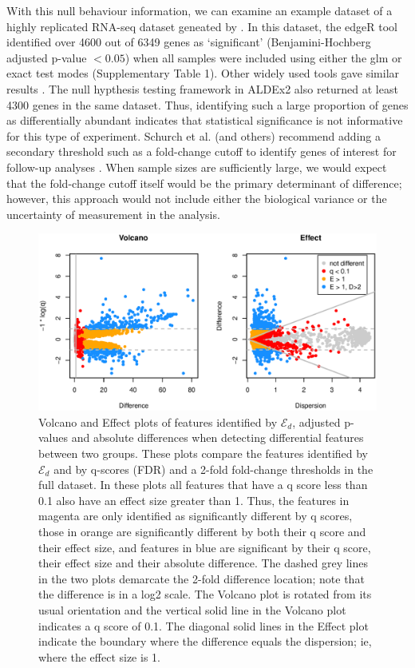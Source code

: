 \documentclass{bioinfo}
\begin{document}
With this null behaviour information, we can examine an example dataset of a highly replicated RNA-seq dataset geneated by \citep{Schurch:2016aa}. In this dataset, the edgeR tool identified over 4600 out of 6349 genes as `significant'  (Benjamini-Hochberg adjusted p-value $< 0.05$) when all samples were included using either the glm or exact test modes (Supplementary Table 1).  Other widely used tools gave similar results \citep{Schurch:2016aa}. The null hypthesis testing framework in ALDEx2 also returned at least 4300 genes in the same dataset. Thus, identifying such a large proportion of genes as differentially abundant indicates that statistical significance is not informative for this type of experiment. Schurch et al. (and others) recommend adding a secondary threshold such as a fold-change cutoff to identify genes of interest for follow-up analyses \citep{Cui:2003aa,Schurch:2016aa}. When sample sizes are sufficiently large, we would expect that the fold-change cutoff itself would be the primary determinant of difference; however, this approach would not include either the biological variance or the uncertainty of measurement in the analysis.  

\begin{figure}[tpb]
\centerline{\includegraphics[scale=0.4]{F3-yeast_volcano.eps}}
\caption{Volcano and Effect plots of features identified by  $\mathcal{E}_{d}$,  adjusted p-values  and absolute differences when detecting differential features between two groups. These plots compare the features identified by $\mathcal{E}_{d}$ and by q-scores (FDR) and a 2-fold fold-change thresholds in the full dataset.  In these plots all features that have a q score less than 0.1 also have an effect size greater than 1. Thus, the features in magenta are only identified as significantly different by q scores, those in orange are significantly different by both their q score and their effect size, and features in blue are significant by their q score, their effect size and their absolute difference.  The dashed grey lines in the two plots demarcate the 2-fold difference location; note that the difference is in a log2 scale. The Volcano plot is rotated from its usual orientation and the vertical solid line in the Volcano plot indicates a q score of 0.1. The diagonal solid lines in the Effect plot indicate the boundary where the difference equals the dispersion; ie, where the effect size is 1.
}
\label{fig:03}
\end{figure}
\end{document}
